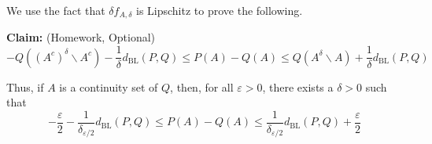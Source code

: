 \documentclass[11pt]{article} %
\begin{document}
We use the fact that $\delta f_{A,\delta}$ is Lipschitz to prove the following.

\noindent \textbf{Claim:} (Homework, Optional) 
\begin{equation}
	- Q ( (A^c)^{\delta} \backslash A^c ) - \frac{1}{\delta} d_{\text{BL}} (P,Q) \leq P(A) - Q(A) \leq Q ( A^{\delta} \backslash A ) + \frac{1}{\delta} d_{\text{BL}} (P,Q)
\end{equation}

Thus, if $A$ is a continuity set of $Q$, then, for all $\varepsilon > 0$, there exists a $\delta > 0$ such that
\begin{equation}
	- \frac{\varepsilon}{2} - \frac{1}{\delta_{\varepsilon/2}} d_{\text{BL}} (P,Q) \leq P(A) - Q(A) \leq \frac{1}{\delta_{\varepsilon/2}} d_{\text{BL}} (P,Q)  + \frac{\varepsilon}{2}
\end{equation}


\newpage
\end{document}

